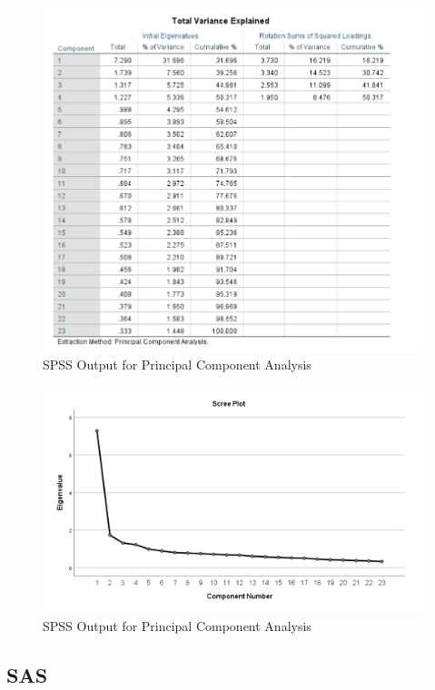 \documentclass[
]{book}
\begin{document}
\begin{figure}[!h]
\includegraphics{Screenshots/Principal Component Analysis/pcaSPSS1} \caption{\label{fig:pcaSPSS}SPSS Output for Principal Component Analysis}\label{fig:pcaSPSS}
\end{figure}

\begin{figure}[!h]
\includegraphics{Screenshots/Principal Component Analysis/pcaSPSS2} \caption{\label{fig:pcaSPSS}SPSS Output for Principal Component Analysis}\label{fig:pcaSPSS2}
\end{figure}

\hypertarget{sas}{%
\subsection{SAS}\label{sas}}
\end{document}
